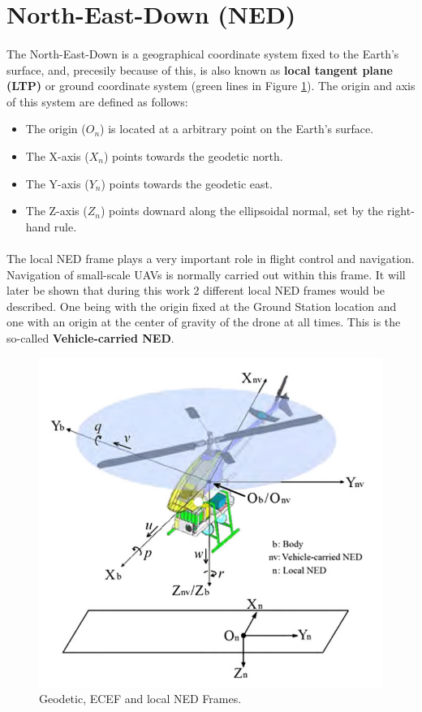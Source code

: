 \section{North-East-Down (NED)}\label{sec:ned}

\paragraph{} The North-East-Down is a geographical coordinate system fixed to the Earth's surface, and, precesily because of this, is also known as \textbf{local tangent plane (LTP)} or ground coordinate system (green lines in Figure \ref{fig:Geodetic1}). The origin and axis of this system are defined as follows: 
\begin{itemize}
\item{The origin (\textbf{$O_{n}$}) is located at a arbitrary point on the Earth's surface.}
\item{The X-axis (\textbf{$X_{n}$}) points towards the geodetic north.}
\item{The Y-axis (\textbf{$Y_{n}$}) points towards the geodetic east.}
\item{The Z-axis (\textbf{$Z_{n}$}) points downard along the ellipsoidal normal, set by the right-hand rule.}
\end{itemize}

\paragraph{} The local NED frame plays a very important role in flight control and navigation.
Navigation of small-scale UAVs is normally carried out within this frame. It will later be shown that during this work 2 different local NED frames would be described. One being with the origin fixed at the Ground Station location and one with an origin at the center of gravity of the drone at all times. This is the so-called \textbf{Vehicle-carried NED}.

\begin{figure}[H]
   \centering
    \includegraphics[width=.70\textwidth]{figures/NEDtemp1.png} 
    \caption{Geodetic, ECEF and local NED Frames.}  
    \label{fig:Geodetic1}
\end{figure}

